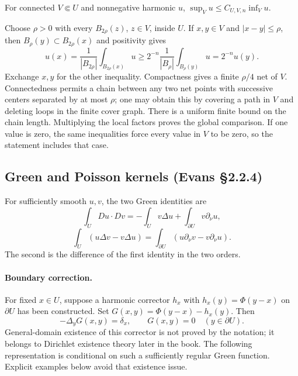 \begin{theorem}
For connected $V\Subset U$ and nonnegative harmonic $u$,
$\sup_Vu\leq C_{U,V,n}\inf_Vu$.
\end{theorem}
\begin{expandedproof}
Choose $\rho>0$ with every $B_{2\rho}(z)$, $z\in V$, inside $U$.
If $x,y\in V$ and $|x-y|\leq\rho$, then
$B_\rho(y)\subset B_{2\rho}(x)$ and positivity gives
\[
 u(x)=\frac1{|B_{2\rho}|}\int_{B_{2\rho}(x)}u
 \geq2^{-n}\frac1{|B_\rho|}\int_{B_\rho(y)}u=2^{-n}u(y).
\]
Exchange $x,y$ for the other inequality.
Compactness gives a finite $\rho/4$ net of $V$.
Connectedness permits a chain between any two net points with successive
centers separated by at most $\rho$; one may obtain this by covering a
path in $V$ and deleting loops in the finite cover graph.
There is a uniform finite bound on the chain length.
Multiplying the local factors proves the global comparison.
If one value is zero, the same inequalities force every value in $V$
to be zero, so the statement includes that case.
\end{expandedproof}

\subsection{Green and Poisson kernels (Evans \S2.2.4)}
For sufficiently smooth $u,v$, the two Green identities are
\[
 \int_U Du\cdot Dv=-\int_Uv\Delta u+\int_{\partial U}v\partial_\nu u,
\]
\[
 \int_U(u\Delta v-v\Delta u)
 =\int_{\partial U}(u\partial_\nu v-v\partial_\nu u).
\]
The second is the difference of the first identity in the two orders.

\paragraph{Boundary correction.}
For fixed $x\in U$, suppose a harmonic corrector $h_x$ with
$h_x(y)=\Phi(y-x)$ on $\partial U$ has been constructed.
Set $G(x,y)=\Phi(y-x)-h_x(y)$. Then
\[
 -\Delta_yG(x,y)=\delta_x,\qquad G(x,y)=0\quad(y\in\partial U).
\]
General-domain existence of this corrector is not proved by the notation;
it belongs to Dirichlet existence theory later in the book.
The following representation is conditional on such a sufficiently
regular Green function. Explicit examples below avoid that existence issue.
\Needspace{45mm}

